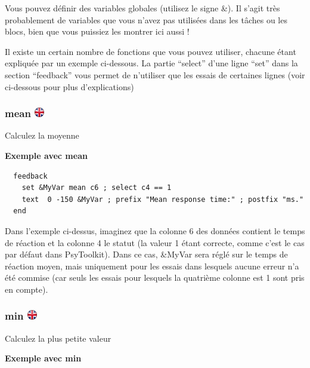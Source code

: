 \documentclass[
]{book}
\begin{document}
Vous pouvez définir des variables globales (utilisez le signe \&). Il
s'agit très probablement de variables que vous n'avez pas utilisées dans
les tâches ou les blocs, bien que vous puissiez les montrer ici aussi !

Il existe un certain nombre de fonctions que vous pouvez utiliser,
chacune étant expliquée par un exemple ci-dessous. La partie ``select''
d'une ligne ``set'' dans la section ``feedback'' vous permet de
n'utiliser que les essais de certaines lignes (voir ci-dessous pour plus
d'explications)

\hypertarget{mean}{%
\subsubsection[mean ]{\texorpdfstring{mean
\href{https://www.psytoolkit.org/doc3.1.0/feedback.html\#_mean}{\protect\includegraphics{img/ukflag.png}}}{mean }}\label{mean}}

Calculez la moyenne

\textbf{Exemple avec mean}

\begin{verbatim}
  feedback
    set &MyVar mean c6 ; select c4 == 1
    text  0 -150 &MyVar ; prefix "Mean response time:" ; postfix "ms."
  end
\end{verbatim}

Dans l'exemple ci-dessus, imaginez que la colonne 6 des données contient
le temps de réaction et la colonne 4 le statut (la valeur 1 étant
correcte, comme c'est le cas par défaut dans PsyToolkit). Dans ce cas,
\&MyVar sera réglé sur le temps de réaction moyen, mais uniquement pour
les essais dans lesquels aucune erreur n'a été commise (car seuls les
essais pour lesquels la quatrième colonne est 1 sont pris en compte).

\hypertarget{min}{%
\subsubsection[min ]{\texorpdfstring{min
\href{https://www.psytoolkit.org/doc3.1.0/feedback.html\#_min}{\protect\includegraphics{img/ukflag.png}}}{min }}\label{min}}

Calculez la plus petite valeur

\textbf{Exemple avec min }
\end{document}
